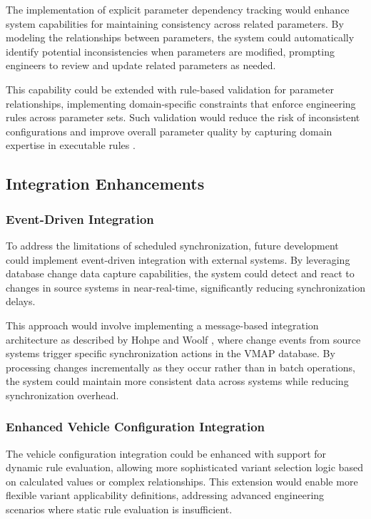 The implementation of explicit parameter dependency tracking would enhance system capabilities for maintaining consistency across related parameters. By modeling the relationships between parameters, the system could automatically identify potential inconsistencies when parameters are modified, prompting engineers to review and update related parameters as needed.

This capability could be extended with rule-based validation for parameter relationships, implementing domain-specific constraints that enforce engineering rules across parameter sets. Such validation would reduce the risk of inconsistent configurations and improve overall parameter quality by capturing domain expertise in executable rules \cite{pretschner2007software}.

\subsection{Integration Enhancements}
\label{subsec:integration-enhancements}

\subsubsection{Event-Driven Integration}
\label{subsubsec:event-driven-integration}

To address the limitations of scheduled synchronization, future development could implement event-driven integration with external systems. By leveraging database change data capture capabilities, the system could detect and react to changes in source systems in near-real-time, significantly reducing synchronization delays.

This approach would involve implementing a message-based integration architecture as described by Hohpe and Woolf \cite{hohpe2002enterprise}, where change events from source systems trigger specific synchronization actions in the \ac{VMAP} database. By processing changes incrementally as they occur rather than in batch operations, the system could maintain more consistent data across systems while reducing synchronization overhead.

\subsubsection{Enhanced Vehicle Configuration Integration}
\label{subsubsec:vehicle-configuration-integration}

The vehicle configuration integration could be enhanced with support for dynamic rule evaluation, allowing more sophisticated variant selection logic based on calculated values or complex relationships. This extension would enable more flexible variant applicability definitions, addressing advanced engineering scenarios where static rule evaluation is insufficient.

